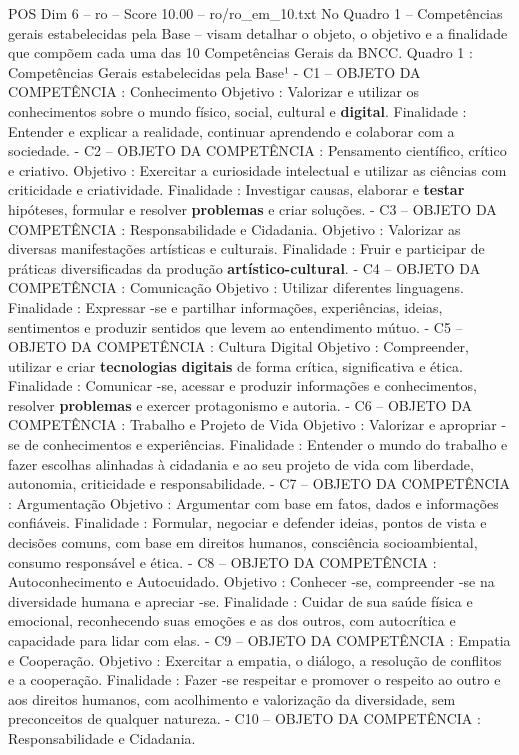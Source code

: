 \begin{textsample}{POS Dim 6 – ro – Score 10.00 – ro/ro\_em\_10.txt}
No Quadro 1 – Competências gerais estabelecidas pela Base – visam detalhar o objeto, o objetivo e a finalidade que compõem cada uma das 10 Competências Gerais da BNCC.
Quadro 1 : Competências Gerais estabelecidas pela Base¹ - C1 – OBJETO DA COMPETÊNCIA : Conhecimento Objetivo : Valorizar e utilizar os conhecimentos sobre o mundo físico, social, cultural e \textbf{digital}.
Finalidade : Entender e explicar a realidade, continuar aprendendo e colaborar com a sociedade. - C2 – OBJETO DA COMPETÊNCIA : Pensamento científico, crítico e criativo.
Objetivo : Exercitar a curiosidade intelectual e utilizar as ciências com criticidade e criatividade.
Finalidade : Investigar causas, elaborar e \textbf{testar} hipóteses, formular e resolver \textbf{problemas} e criar soluções. - C3 – OBJETO DA COMPETÊNCIA : Responsabilidade e Cidadania.
Objetivo : Valorizar as diversas manifestações artísticas e culturais.
Finalidade : Fruir e participar de práticas diversificadas da produção \textbf{artístico-cultural}. - C4 – OBJETO DA COMPETÊNCIA : Comunicação Objetivo : Utilizar diferentes linguagens.
Finalidade : Expressar -se e partilhar informações, experiências, ideias, sentimentos e produzir sentidos que levem ao entendimento mútuo. - C5 – OBJETO DA COMPETÊNCIA : Cultura Digital Objetivo : Compreender, utilizar e criar \textbf{tecnologias} \textbf{digitais} de forma crítica, significativa e ética.
Finalidade : Comunicar -se, acessar e produzir informações e conhecimentos, resolver \textbf{problemas} e exercer protagonismo e autoria. - C6 – OBJETO DA COMPETÊNCIA : Trabalho e Projeto de Vida Objetivo : Valorizar e apropriar -se de conhecimentos e experiências.
Finalidade : Entender o mundo do trabalho e fazer escolhas alinhadas à cidadania e ao seu projeto de vida com liberdade, autonomia, criticidade e responsabilidade. - C7 – OBJETO DA COMPETÊNCIA : Argumentação Objetivo : Argumentar com base em fatos, dados e informações confiáveis.
Finalidade : Formular, negociar e defender ideias, pontos de vista e decisões comuns, com base em direitos humanos, consciência socioambiental, consumo responsável e ética. - C8 – OBJETO DA COMPETÊNCIA : Autoconhecimento e Autocuidado.
Objetivo : Conhecer -se, compreender -se na diversidade humana e apreciar -se.
Finalidade : Cuidar de sua saúde física e emocional, reconhecendo suas emoções e as dos outros, com autocrítica e capacidade para lidar com elas. - C9 – OBJETO DA COMPETÊNCIA : Empatia e Cooperação.
Objetivo : Exercitar a empatia, o diálogo, a resolução de conflitos e a cooperação.
Finalidade : Fazer -se respeitar e promover o respeito ao outro e aos direitos humanos, com acolhimento e valorização da diversidade, sem preconceitos de qualquer natureza. - C10 – OBJETO DA COMPETÊNCIA : Responsabilidade e Cidadania.

\end{textsample}
